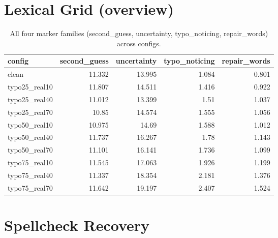 \documentclass[11pt]{article}
\begin{document}
\section*{Lexical Grid (overview)}
\begin{table}[H]
\centering
\caption{All four marker families (second\_guess, uncertainty, typo\_noticing, repair\_words) across configs.}
\small
\begin{adjustbox}{max width=\textwidth}
\begin{tabular}{lrrrr}
\toprule
\textbf{config} & \textbf{second\_guess} & \textbf{uncertainty} & \textbf{typo\_noticing} & \textbf{repair\_words} \\
\midrule
clean & 11.332 & 13.995 & 1.084 & 0.801 \\
typo25\_real10 & 11.807 & 14.511 & 1.416 & 0.922 \\
typo25\_real40 & 11.012 & 13.399 & 1.51 & 1.037 \\
typo25\_real70 & 10.85 & 14.574 & 1.555 & 1.056 \\
typo50\_real10 & 10.975 & 14.69 & 1.588 & 1.012 \\
typo50\_real40 & 11.737 & 16.267 & 1.78 & 1.143 \\
typo50\_real70 & 11.101 & 16.141 & 1.736 & 1.099 \\
typo75\_real10 & 11.545 & 17.063 & 1.926 & 1.199 \\
typo75\_real40 & 11.337 & 18.354 & 2.181 & 1.376 \\
typo75\_real70 & 11.642 & 19.197 & 2.407 & 1.524 \\
\bottomrule
\end{tabular}
\end{adjustbox}
\end{table}

\section*{Spellcheck Recovery}

\end{document}
